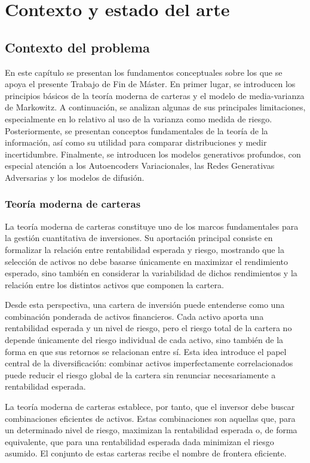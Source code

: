 \clearpage
\chapter{Contexto y estado del arte}

\section{Contexto del problema}

En este capítulo se presentan los fundamentos conceptuales sobre los que se apoya el presente Trabajo de Fin de Máster. En primer lugar, se introducen los principios básicos de la teoría moderna de carteras y el modelo de media-varianza de Markowitz. A continuación, se analizan algunas de sus principales limitaciones, especialmente en lo relativo al uso de la varianza como medida de riesgo. Posteriormente, se presentan conceptos fundamentales de la teoría de la información, así como su utilidad para comparar distribuciones y medir incertidumbre. Finalmente, se introducen los modelos generativos profundos, con especial atención a los Autoencoders Variacionales, las Redes Generativas Adversarias y los modelos de difusión.

\subsection{Teoría moderna de carteras}

La teoría moderna de carteras constituye uno de los marcos fundamentales para la gestión cuantitativa de inversiones. Su aportación principal consiste en formalizar la relación entre rentabilidad esperada y riesgo, mostrando que la selección de activos no debe basarse únicamente en maximizar el rendimiento esperado, sino también en considerar la variabilidad de dichos rendimientos y la relación entre los distintos activos que componen la cartera.

Desde esta perspectiva, una cartera de inversión puede entenderse como una combinación ponderada de activos financieros. Cada activo aporta una rentabilidad esperada y un nivel de riesgo, pero el riesgo total de la cartera no depende únicamente del riesgo individual de cada activo, sino también de la forma en que sus retornos se relacionan entre sí. Esta idea introduce el papel central de la diversificación: combinar activos imperfectamente correlacionados puede reducir el riesgo global de la cartera sin renunciar necesariamente a rentabilidad esperada.

La teoría moderna de carteras establece, por tanto, que el inversor debe buscar combinaciones eficientes de activos. Estas combinaciones son aquellas que, para un determinado nivel de riesgo, maximizan la rentabilidad esperada o, de forma equivalente, que para una rentabilidad esperada dada minimizan el riesgo asumido. El conjunto de estas carteras recibe el nombre de frontera eficiente.

